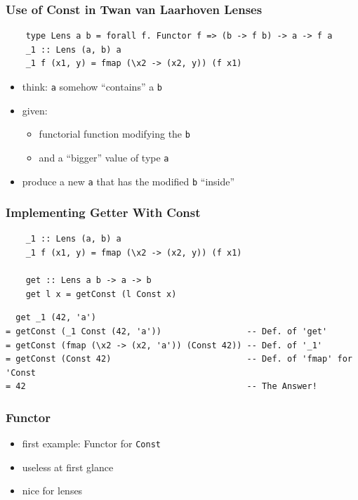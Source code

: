 \documentclass[aspectratio=169]{beamer}
\begin{document}
\begin{frame}[fragile]
  \frametitle{Use of Const in Twan van Laarhoven Lenses}
  \begin{verbatim}
    type Lens a b = forall f. Functor f => (b -> f b) -> a -> f a
    _1 :: Lens (a, b) a
    _1 f (x1, y) = fmap (\x2 -> (x2, y)) (f x1)
  \end{verbatim}

  \begin{itemize}
  \item think: \texttt{a} somehow ``contains'' a \texttt{b}
  \item given:
    \begin{itemize}
    \item functorial function modifying the \texttt{b}
    \item and a ``bigger'' value of type \texttt{a}
    \end{itemize}
  \item produce a new \texttt{a} that has the modified \texttt{b} ``inside''
  \end{itemize}
\end{frame}

\begin{frame}[fragile]
  \frametitle{Implementing Getter With Const}
  \begin{verbatim}
    _1 :: Lens (a, b) a
    _1 f (x1, y) = fmap (\x2 -> (x2, y)) (f x1)

    get :: Lens a b -> a -> b
    get l x = getConst (l Const x)
  \end{verbatim}
  \vfill
  \begin{verbatim}
  get _1 (42, 'a')
= getConst (_1 Const (42, 'a'))                 -- Def. of 'get'
= getConst (fmap (\x2 -> (x2, 'a')) (Const 42)) -- Def. of '_1'
= getConst (Const 42)                           -- Def. of 'fmap' for 'Const
= 42                                            -- The Answer!
  \end{verbatim}
\end{frame}

\begin{frame}
  \frametitle{Functor}
  \begin{itemize}
  \item first example: Functor for \texttt{Const}
  \item useless at first glance
  \item nice for lenses
  \end{itemize}
\end{frame}
\end{document}

